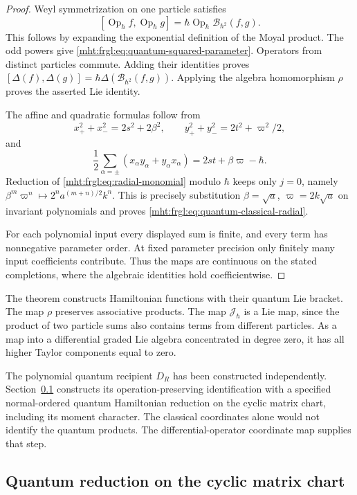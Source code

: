 \begin{proof}
Weyl symmetrization on one particle satisfies
\[
 [\operatorname{Op}_\hbar f,\operatorname{Op}_\hbar g]
 =\hbar\operatorname{Op}_\hbar \mathcal B_{\hbar^2}(f,g).
\]
This follows by expanding the exponential definition of the
Moyal product. The odd powers give
\eqref{mht:frgl:eq:quantum-squared-parameter}.  Operators from distinct
particles commute.  Adding their identities proves
$[\Delta(f),\Delta(g)]=\hbar\Delta(\mathcal B_{\hbar^2}(f,g))$.
Applying the algebra homomorphism $\rho$ proves the asserted
Lie identity.

The affine and quadratic formulas follow from
\[
 x_+^2+x_-^2=2s^2+2\beta^2,\qquad
 y_+^2+y_-^2=2t^2+\varpi^2/2,
\]
and
\[
 \frac12\sum_{\alpha=\pm}
       (x_\alpha y_\alpha+y_\alpha x_\alpha)
       =2st+\beta\varpi-\hbar.
\]
Reduction of \eqref{mht:frgl:eq:radial-monomial} modulo $\hbar$ keeps
only $j=0$, namely
$\beta^m \varpi^n\mapsto 2^n a^{(m+n)/2}k^n$.
This is precisely substitution $\beta=\sqrt a$, $\varpi=2k\sqrt a$
on invariant polynomials and proves
\eqref{mht:frgl:eq:quantum-classical-radial}.

For each polynomial input every displayed sum is finite, and
every term has nonnegative parameter order.  At fixed parameter
precision only finitely many input coefficients contribute.
Thus the maps are continuous on the stated completions, where
the algebraic identities hold coefficientwise.
\end{proof}

The theorem constructs Hamiltonian functions with their quantum
Lie bracket.  The map $\rho$ preserves associative products. The map
$\mathcal J_\hbar$ is a Lie map, since the product of two
particle sums also contains terms from different particles.
As a map into a differential graded Lie algebra concentrated in
degree zero, it has all higher Taylor components equal to zero.

The polynomial quantum recipient $D_R$ has been constructed
independently.  Section~\ref{mht:frgl:sec:native-local-quantum} constructs
its operation-preserving identification with a specified
normal-ordered quantum Hamiltonian reduction on the cyclic
matrix chart, including its moment character.  The classical
coordinates alone would not identify the quantum products. The differential-operator coordinate map supplies that step.

\subsection{Quantum reduction on the cyclic matrix chart}
\label{mht:frgl:sec:native-local-quantum}


